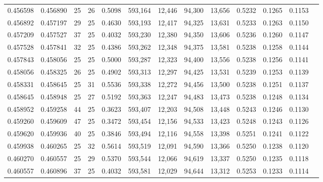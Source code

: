 \begin{tabular}{rrrrrrrrrrrrr}
0.456598 & 0.456890 &    25 &  26 &                                     0.5098 & 593,164 &  12,446 &  94,300 &  13,656 & 0.5232 & 0.1265 & 0.1153 \\
0.456892 & 0.457197 &    29 &  25 &                                     0.4630 & 593,193 &  12,417 &  94,325 &  13,631 & 0.5233 & 0.1263 & 0.1150 \\
0.457209 & 0.457527 &    37 &  25 &                                     0.4032 & 593,230 &  12,380 &  94,350 &  13,606 & 0.5236 & 0.1260 & 0.1147 \\
0.457528 & 0.457841 &    32 &  25 &                                     0.4386 & 593,262 &  12,348 &  94,375 &  13,581 & 0.5238 & 0.1258 & 0.1144 \\
0.457843 & 0.458056 &    25 &  25 &                                     0.5000 & 593,287 &  12,323 &  94,400 &  13,556 & 0.5238 & 0.1256 & 0.1141 \\
0.458056 & 0.458325 &    26 &  25 &                                     0.4902 & 593,313 &  12,297 &  94,425 &  13,531 & 0.5239 & 0.1253 & 0.1139 \\
0.458331 & 0.458645 &    25 &  31 &                                     0.5536 & 593,338 &  12,272 &  94,456 &  13,500 & 0.5238 & 0.1251 & 0.1137 \\
0.458645 & 0.458948 &    25 &  27 &                                     0.5192 & 593,363 &  12,247 &  94,483 &  13,473 & 0.5238 & 0.1248 & 0.1134 \\
0.458952 & 0.459258 &    44 &  25 &                                     0.3623 & 593,407 &  12,203 &  94,508 &  13,448 & 0.5243 & 0.1246 & 0.1130 \\
0.459260 & 0.459609 &    47 &  25 &                                     0.3472 & 593,454 &  12,156 &  94,533 &  13,423 & 0.5248 & 0.1243 & 0.1126 \\
0.459620 & 0.459936 &    40 &  25 &                                     0.3846 & 593,494 &  12,116 &  94,558 &  13,398 & 0.5251 & 0.1241 & 0.1122 \\
0.459938 & 0.460265 &    25 &  32 &                                     0.5614 & 593,519 &  12,091 &  94,590 &  13,366 & 0.5250 & 0.1238 & 0.1120 \\
0.460270 & 0.460557 &    25 &  29 &                                     0.5370 & 593,544 &  12,066 &  94,619 &  13,337 & 0.5250 & 0.1235 & 0.1118 \\
0.460557 & 0.460896 &    37 &  25 &                                     0.4032 & 593,581 &  12,029 &  94,644 &  13,312 & 0.5253 & 0.1233 & 0.1114 \\

\end{tabular}

